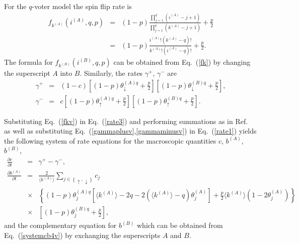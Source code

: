 \documentclass[11pt]{article}
\begin{document}
For the $q$-voter model the spin flip rate is
\begin{eqnarray}
f_{k^{(A)}}\left( i^{(A)},q,p\right) &=&
(1-p) \frac{\prod_{j=1}^{q}\left( i^{(A)}-j+1\right)}{\prod_{j=1}^{q}\left( k^{(A)}-j+1\right)} +\frac{p}{2}
\nonumber\\
&=&
(1-p)\frac{i^{(A)}!\left( k^{(A)} -q\right)!}{k^{(A)}!\left(i^{(A)}-q\right)!} +\frac{p}{2}.
\label{fkv}
\end{eqnarray}
 The formula for $f_{k^{(B)}}\left( i^{(B)},q,p\right)$ 
can be obtained from Eq.\ (\ref{fk}) by changing the superscript $A$ into $B$. Similarly, the rates
$\gamma^{+}$, $\gamma^{-}$ are
\begin{eqnarray}
\gamma^{+}&=& (1-c) \left[ (1-p)\theta_{\downarrow}^{(A)q} +\frac{p}{2}\right]
\left[ (1-p)\theta_{\downarrow}^{(B)q} +\frac{p}{2}\right], 
\label{gammaplusv}
\\
\gamma^{-}&=& c \left[ (1-p)\theta_{\uparrow}^{(A)q} +\frac{p}{2}\right]
\left[ (1-p)\theta_{\uparrow}^{(B)q} +\frac{p}{2}\right].
\label{gammaminusv}
\end{eqnarray}

Substituting Eq.\ (\ref{fkv}) in Eq.\ (\ref{rate3}) and performing summations as in Ref.\ \cite{Jedrzejewski17} as well as
substituting Eq.\ (\ref{gammaplusv},\ref{gammaminusv}) in Eq.\ (\ref{rate1}) yields the following system of rate
equations for the macroscopic quantities $c$, $b^{(A)}$, $b^{(B)}$,
\begin{eqnarray}
\frac{\partial c}{\partial t} &=&\gamma^{+}-\gamma^{-}, 
\label{systemcb3v}\\
\frac{\partial b^{(A)}}{\partial t} &=& \frac{2}{\langle k^{(A)}\rangle} \sum_{j\in \left\{ \uparrow,\downarrow\right\}} c_{j} \nonumber\\
& \times&  \left\{ (1-p) \theta_{j}^{(A)q}
\left[  \langle k^{(A)}\rangle-2q -2 \left( \langle k^{(A)}\rangle -q\right) \theta_{j}^{(A)} \right]
+\frac{p}{2}\langle k^{(A)}\rangle \left(1-2 \theta_{j}^{(A)}\right) \right\} \nonumber\\
&\times& \left[ (1-p) \theta_{j}^{(B)q} +\frac{p}{2}\right],
\label{systemcb4v}
\end{eqnarray}
and the complementary equation for $b^{(B)}$ which can be obtained from Eq.\ (\ref{systemcb4v}) by exchanging the 
superscripts $A$ and $B$.
\end{document}
